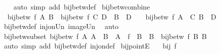 \begin{isabellebody}
%
\isadelimproof
\ \ %
\endisadelimproof
%
\isatagproof
{}\isamarkupfalse%
\ {\isacharparenleft}{\kern0pt}auto\ simp\ add{\isacharcolon}{\kern0pt}\ bij{\isacharunderscore}{\kern0pt}betw{\isacharunderscore}{\kern0pt}def{\isacharparenright}{\kern0pt}%
\endisatagproof
{\isafoldproof}%
%
\isadelimproof
\isanewline
%
\endisadelimproof
\isanewline
{}\isamarkupfalse%
\ bij{\isacharunderscore}{\kern0pt}betw{\isacharunderscore}{\kern0pt}combine{\isacharcolon}{\kern0pt}\isanewline
\ \ {\isachardoublequoteopen}bij{\isacharunderscore}{\kern0pt}betw\ f\ A\ B\ {\isasymLongrightarrow}\ bij{\isacharunderscore}{\kern0pt}betw\ f\ C\ D\ {\isasymLongrightarrow}\ B\ {\isasyminter}\ D\ {\isacharequal}{\kern0pt}\ {\isacharbraceleft}{\kern0pt}{\isacharbraceright}{\kern0pt}\ {\isasymLongrightarrow}\ bij{\isacharunderscore}{\kern0pt}betw\ f\ {\isacharparenleft}{\kern0pt}A\ {\isasymunion}\ C{\isacharparenright}{\kern0pt}\ {\isacharparenleft}{\kern0pt}B\ {\isasymunion}\ D{\isacharparenright}{\kern0pt}{\isachardoublequoteclose}\isanewline
%
\isadelimproof
\ \ %
\endisadelimproof
%
\isatagproof
{}\isamarkupfalse%
\ bij{\isacharunderscore}{\kern0pt}betw{\isacharunderscore}{\kern0pt}def\ inj{\isacharunderscore}{\kern0pt}on{\isacharunderscore}{\kern0pt}Un\ image{\isacharunderscore}{\kern0pt}Un\ \isamarkupfalse%
\ auto%
\endisatagproof
{\isafoldproof}%
%
\isadelimproof
\isanewline
%
\endisadelimproof
\isanewline
{}\isamarkupfalse%
\ bij{\isacharunderscore}{\kern0pt}betw{\isacharunderscore}{\kern0pt}subset{\isacharcolon}{\kern0pt}\ {\isachardoublequoteopen}bij{\isacharunderscore}{\kern0pt}betw\ f\ A\ A{\isacharprime}{\kern0pt}\ {\isasymLongrightarrow}\ B\ {\isasymsubseteq}\ A\ {\isasymLongrightarrow}\ f\ {\isacharbackquote}{\kern0pt}\ B\ {\isacharequal}{\kern0pt}\ B{\isacharprime}{\kern0pt}\ {\isasymLongrightarrow}\ bij{\isacharunderscore}{\kern0pt}betw\ f\ B\ B{\isacharprime}{\kern0pt}{\isachardoublequoteclose}\isanewline
%
\isadelimproof
\ \ %
\endisadelimproof
%
\isatagproof
{}\isamarkupfalse%
\ {\isacharparenleft}{\kern0pt}auto\ simp\ add{\isacharcolon}{\kern0pt}\ bij{\isacharunderscore}{\kern0pt}betw{\isacharunderscore}{\kern0pt}def\ inj{\isacharunderscore}{\kern0pt}on{\isacharunderscore}{\kern0pt}def{\isacharparenright}{\kern0pt}%
\endisatagproof
{\isafoldproof}%
%
\isadelimproof
\isanewline
%
\endisadelimproof
\isanewline
{}\isamarkupfalse%
\ bij{\isacharunderscore}{\kern0pt}pointE{\isacharcolon}{\kern0pt}\isanewline
\ \ \ {\isachardoublequoteopen}bij\ f{\isachardoublequoteclose}\isanewline

\end{isabellebody}
